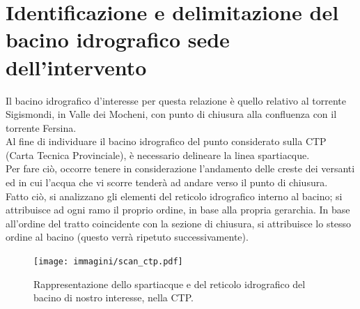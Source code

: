 \section{Identificazione e delimitazione del bacino idrografico sede dell'intervento}
Il bacino idrografico d'interesse per questa relazione è quello relativo al torrente Sigismondi, in Valle dei Mocheni, con punto di chiusura alla confluenza con il torrente Fersina.\\
Al fine di individuare il bacino idrografico del punto considerato sulla CTP (Carta Tecnica Provinciale), è necessario delineare la linea spartiacque.\\
Per fare ciò, occorre tenere in considerazione l'andamento delle creste dei versanti ed in cui l'acqua che vi scorre tenderà ad andare verso il punto di chiusura.\\
Fatto ciò, si analizzano gli elementi del reticolo idrografico interno al bacino; si attribuisce ad ogni ramo il proprio ordine, in base alla propria gerarchia. In base all'ordine del tratto coincidente con la sezione di chiusura, si attribuisce lo stesso ordine al bacino (questo verrà ripetuto successivamente).
\begin{figure}[H]\centering
    \texttt{[image: immagini/scan\_ctp.pdf]}
    \caption{Rappresentazione dello spartiacque e del reticolo idrografico del bacino di nostro interesse, nella CTP.}
  \label{scan_ctp}
\end{figure}

